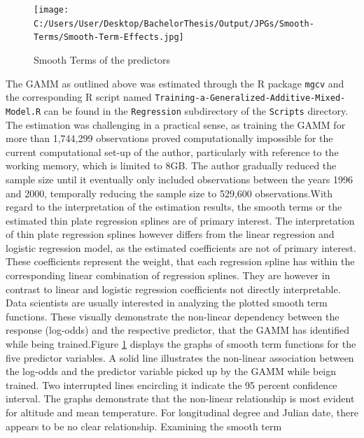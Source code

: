 \documentclass[
  12pt,
]{article}
\begin{document}
\begin{figure}[H]
  \begingroup
  \centering
  \texttt{[image: C:/Users/User/Desktop/BachelorThesis/Output/JPGs/Smooth-Terms/Smooth-Term-Effects.jpg]}
  \caption{Smooth Terms of the predictors}
  \label{fig:smooth_term_effects}
  \endgroup
\end{figure}

\FloatBarrier

The GAMM as outlined above was estimated through the R package
\texttt{mgcv} and the corresponding R script named
\texttt{Training-a-Generalized-Additive-Mixed-Model.R} can be found in
the \texttt{Regression} subdirectory of the \texttt{Scripts} directory.
The estimation was challenging in a practical sense, as training the
GAMM for more than 1,744,299 observations proved computationally
impossible for the current computational set-up of the author,
particularly with reference to the working memory, which is limited to
8GB. The author gradually reduced the sample size until it eventually
only included observations between the years 1996 and 2000, temporally
reducing the sample size to 529,600 observations.\newline With regard to
the interpretation of the estimation results, the smooth terms or the
estimated thin plate regression splines are of primary interest. The
interpretation of thin plate regression splines however differs from the
linear regression and logistic regression model, as the estimated
coefficients are not of primary interest. These coefficients represent
the weight, that each regression spline has within the corresponding
linear combination of regression splines. They are however in contrast
to linear and logistic regression coefficients not directly
interpretable. Data scientists are usually interested in analyzing the
plotted smooth term functions. These visually demonstrate the non-linear
dependency between the response (log-odds) and the respective predictor,
that the GAMM has identified while being trained.\newline  Figure
\ref{fig:smooth_term_effects} displays the graphs of smooth term
functions for the five predictor variables. A solid line illustrates the
non-linear association between the log-odds and the predictor variable
picked up by the GAMM while beign trained. Two interrupted lines
encircling it indicate the 95 percent confidence interval. The graphs
demonstrate that the non-linear relationship is most evident for
altitude and mean temperature. For longitudinal degree and Julian date,
there appears to be no clear relationship. Examining the smooth term
\end{document}
